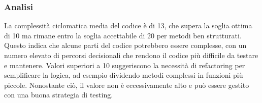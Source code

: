 \documentclass[a4paper,11pt,oneside]{scrartcl}
\begin{document}
\subsubsection*{Analisi}

La complessità ciclomatica media del codice è di 13, che supera la soglia ottima di 10 ma rimane entro la soglia accettabile di 20 per metodi ben strutturati. Questo indica che alcune parti del codice potrebbero essere complesse, con un numero elevato di percorsi decisionali che rendono il codice più difficile da testare e mantenere. Valori superiori a 10 suggeriscono la necessità di refactoring per semplificare la logica, ad esempio dividendo metodi complessi in funzioni più piccole. Nonostante ciò, il valore non è eccessivamente alto e può essere gestito con una buona strategia di testing.
\end{document}
